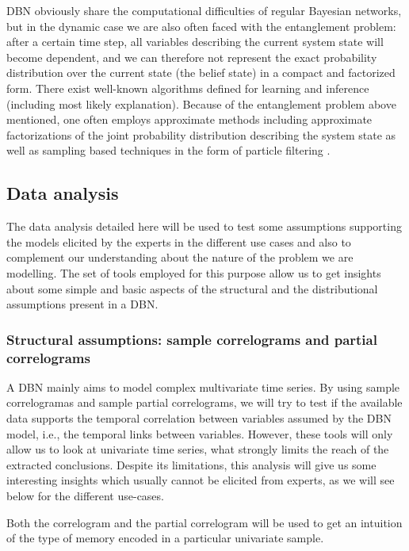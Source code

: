 DBN obviously share the computational difficulties of regular Bayesian networks, but in the dynamic case we are also often faced with the entanglement problem: after a certain time step, all variables describing the current system state will become dependent, and we can therefore not represent the exact probability distribution over the current state (the belief state) in a compact and factorized form. There exist well-known algorithms defined for learning and inference (including most likely explanation). Because of the entanglement problem above mentioned, one often employs approximate methods including approximate factorizations of the joint probability distribution describing the system state \cite{BoyenKoller1998} as well as sampling based techniques in the form of particle filtering \cite{Doucet2000}.

\subsection{Data analysis}\label{SubSection:DataAnalysis}

The data analysis detailed here will be used to test some assumptions supporting the models elicited by the experts in the different use cases and also to complement our understanding about the nature of the problem we are modelling. The set of tools employed for this purpose allow us to get insights about some simple and basic aspects of the structural and the distributional assumptions present in a DBN.

\subsubsection*{Structural assumptions: sample correlograms and partial correlograms}

A DBN mainly aims to model complex multivariate time series. By using sample correlogramas and sample partial correlograms, we will try to test if the available data supports the temporal correlation between variables assumed by the DBN model, i.e., the temporal links between variables. However, these tools will only allow us to look at univariate time series, what strongly limits the reach of the  extracted conclusions. Despite its limitations, this analysis will give us some interesting insights which usually cannot be elicited from experts, as we will see below for the different use-cases.  

Both the correlogram and the partial correlogram will be used to get an intuition of the type of memory encoded in a particular univariate sample. 


